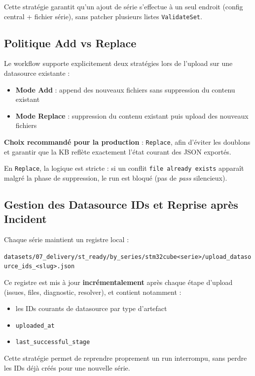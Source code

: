 \documentclass[12pt,a4paper]{report}
\begin{document}
Cette stratégie garantit qu'un ajout de série s'effectue à un seul endroit (config central + fichier série), sans patcher plusieurs listes \texttt{ValidateSet}.

\subsection{Politique Add vs Replace}

Le workflow supporte explicitement deux stratégies lors de l'upload sur une datasource existante :

\begin{itemize}
  \item \textbf{Mode Add} : append des nouveaux fichiers sans suppression du contenu existant
  \item \textbf{Mode Replace} : suppression du contenu existant puis upload des nouveaux fichiers
\end{itemize}

\textbf{Choix recommandé pour la production} : \texttt{Replace}, afin d'éviter les doublons et garantir que la KB reflète exactement l'état courant des JSON exportés.

En \texttt{Replace}, la logique est stricte : si un conflit \texttt{file already exists} apparaît malgré la phase de suppression, le run est bloqué (pas de \textit{pass} silencieux).

\subsection{Gestion des Datasource IDs et Reprise après Incident}

Chaque série maintient un registre local :
\begin{center}
\texttt{datasets/07\_delivery/st\_ready/by\_series/stm32cube<serie>/upload\_datasource\_ids\_<slug>.json}
\end{center}

Ce registre est mis à jour \textbf{incrémentalement} après chaque étape d'upload (issues, files, diagnostic, resolver), et contient notamment :
\begin{itemize}
  \item les IDs courants de datasource par type d'artefact
  \item \texttt{uploaded\_at}
  \item \texttt{last\_successful\_stage}
\end{itemize}

Cette stratégie permet de reprendre proprement un run interrompu, sans perdre les IDs déjà créés pour une nouvelle série.
\end{document}

